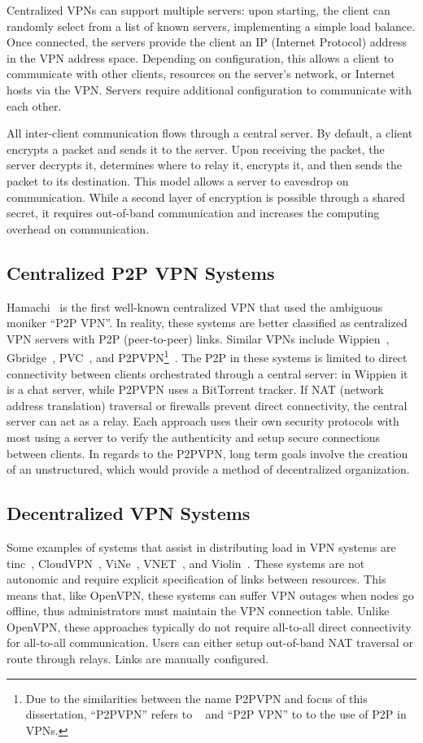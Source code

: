 Centralized VPNs can support multiple servers: upon starting, the client can
randomly select from a list of known servers, implementing a simple load
balance.  Once connected, the servers provide the client an IP (Internet
Protocol) address in the VPN address space. Depending on configuration, this
allows a client to communicate with other clients, resources on the server's
network, or Internet hosts via the VPN.  Servers require additional
configuration to communicate with each other.

All inter-client communication flows through a central server.  By default, a
client encrypts a packet and sends it to the server.  Upon receiving the
packet, the server decrypts it, determines where to relay it, encrypts it, and
then sends the packet to its destination.  This model allows a server to
eavesdrop on communication.  While a second layer of encryption is possible
through a shared secret, it requires out-of-band communication and increases
the computing overhead on communication.


\subsection{Centralized P2P VPN Systems}

Hamachi~\cite{hamachi} is the first well-known centralized VPN that used the
ambiguous moniker ``P2P VPN''.  In reality, these systems are better classified
as centralized VPN servers with P2P (peer-to-peer) links.  Similar VPNs include
Wippien~\cite{wippien}, Gbridge~\cite{gbridge}, PVC~\cite{pvc}, and
P2PVPN\footnote{Due to the similarities between the name P2PVPN and focus of
this dissertation, ``P2PVPN'' refers to ~\cite{p2pvpn} and ``P2P VPN'' to to
the use of P2P in VPNs.}~\cite{p2pvpn}.  The P2P in these systems is limited to
direct connectivity between clients orchestrated through a central server: in
Wippien it is a chat server, while P2PVPN uses a BitTorrent tracker.  If NAT
(network address translation) traversal or firewalls prevent direct
connectivity, the central server can act as a relay.  Each approach uses their
own security protocols with most using a server to verify the authenticity and
setup secure connections between clients.  In regards to the P2PVPN, long term
goals involve the creation of an unstructured, which would provide a method of
decentralized organization.

\subsection{Decentralized VPN Systems}
Some examples of systems that assist in distributing load in VPN systems are
tinc~\cite{tinc}, CloudVPN~\cite{cloudvpn}, ViNe~\cite{vine}, VNET~\cite{vnet},
and Violin~\cite{violin}.  These systems are not autonomic and require explicit
specification of links between resources.  This means that, like OpenVPN, these
systems can suffer VPN outages when nodes go offline, thus administrators must
maintain the VPN connection table.  Unlike OpenVPN, these approaches typically
do not require all-to-all direct connectivity for all-to-all communication.
Users can either setup out-of-band NAT traversal or route through relays.  Links
are manually configured.

